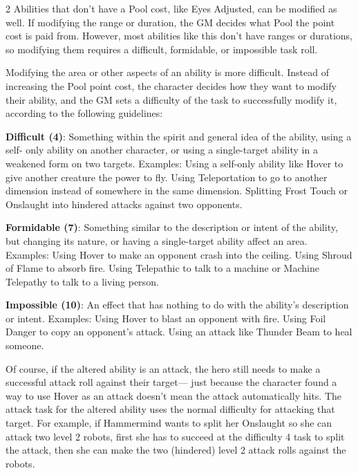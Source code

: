 \begin{multicols}{2}
Abilities that don’t have a Pool cost, like Eyes Adjusted, can be modified as well. If modifying the range or duration, the GM decides what Pool the point cost is paid from. However, most abilities like this don’t have ranges or durations, so modifying them requires a difficult, formidable, or impossible task roll.

Modifying the area or other aspects of an ability is more difficult. Instead
of increasing the Pool point cost, the character decides how they want to modify their ability, and the GM sets a difficulty of the task to successfully modify it, according to the following guidelines:

\textbf{Difficult (4)}: Something within the spirit and general idea of the ability, using a self- only ability on another character, or using a single-target ability in a weakened form on two targets. Examples: Using a self-only ability like Hover to give another creature the power to fly. Using Teleportation to go to another dimension instead of somewhere in the same dimension. Splitting Frost Touch or Onslaught into hindered attacks against two opponents.

\textbf{Formidable (7)}: Something similar to the description or intent of the ability, but changing its nature, or having a single-target ability affect an area. Examples: Using Hover to make an opponent crash into the ceiling. Using Shroud of Flame to absorb fire. Using Telepathic to talk to a machine or Machine Telepathy to talk to a living person.

\textbf{Impossible (10)}: An effect that has nothing to do with the ability’s description or intent. Examples: Using Hover to blast an opponent with fire. Using Foil Danger to copy an opponent’s attack. Using an attack like Thunder Beam to heal someone.

Of course, if the altered ability is an attack, the hero still needs to make a successful attack roll against their target— just because the character found a way to use Hover as an attack doesn’t mean the attack automatically hits. The attack task for the altered ability uses the normal difficulty for attacking that target. For example, if Hammermind wants to split her Onslaught so she can attack two level 2 robots, first she has to succeed at the difficulty 4 task to split the attack, then she can make the two (hindered) level 2 attack rolls against the robots.


\end{multicols}
